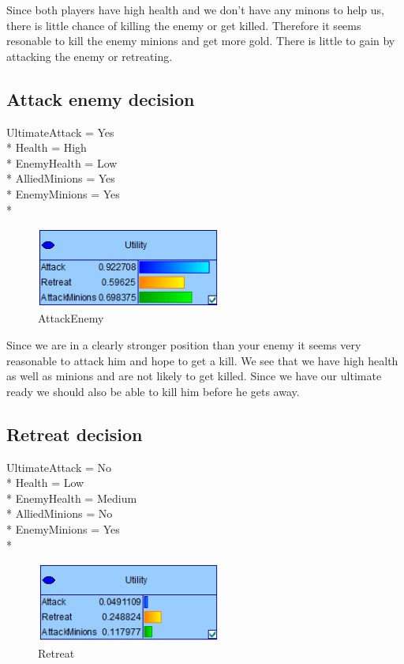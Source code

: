\documentclass[titlepage]{article}
\begin{document}
Since both players have high health and we don't have any minons to help us, there is little chance of killing the enemy or get killed. Therefore it seems resonable to kill the enemy minions and get more gold. There is little to gain by attacking the enemy or retreating.

\subsection*{Attack enemy decision}
UltimateAttack = Yes \\*
Health = High \\*
EnemyHealth = Low \\*
AlliedMinions = Yes \\*
EnemyMinions = Yes \\*

\begin{figure}[H] \centering
\includegraphics[width=230px]{atkEnemy.PNG}
\caption{AttackEnemy}
\label{fig:atkEnemy}
\end{figure}

Since we are in a clearly stronger position than your enemy it seems very reasonable to attack him and hope to get a kill. We see that we have high health as well as minions and are not likely to get killed. Since we have our ultimate ready we should also be able to kill him before he gets away.

\subsection*{Retreat decision}
UltimateAttack = No \\*
Health = Low \\*
EnemyHealth = Medium \\*
AlliedMinions = No \\*
EnemyMinions = Yes \\*

\begin{figure}[H] \centering
\includegraphics[width=230px]{Retreat.PNG}
\caption{Retreat}
\label{fig:retreat}
\end{figure}
\end{document}
